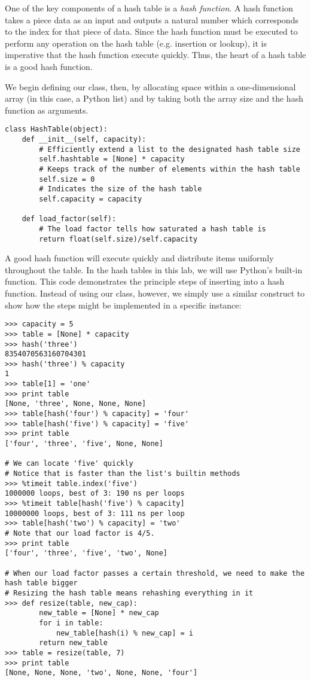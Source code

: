 One of the key components of a hash table is a \emph{hash function}.
A hash function takes a piece data as an input and outputs a natural number which corresponds to the index for that piece of data.
Since the hash function must be executed to perform any operation on the hash table (e.g. insertion or lookup), it is imperative that the hash function execute quickly.
Thus, the heart of a hash table is a good hash function.

We begin defining our  class, then, by allocating space within a one-dimensional array (in this case, a Python list) and by taking both the array size and the hash function as arguments.
\begin{lstlisting}
class HashTable(object):
    def __init__(self, capacity):
        # Efficiently extend a list to the designated hash table size
        self.hashtable = [None] * capacity
        # Keeps track of the number of elements within the hash table
        self.size = 0
        # Indicates the size of the hash table
        self.capacity = capacity

    def load_factor(self):
        # The load factor tells how saturated a hash table is
        return float(self.size)/self.capacity
\end{lstlisting}


A good hash function will execute quickly and distribute items uniformly throughout the table.
In the hash tables in this lab, we will use Python's built-in  function.
This code demonstrates the principle steps of inserting into a hash function.
Instead of using our  class, however, we simply use a similar construct to show how the steps might be implemented in a specific instance:
\begin{lstlisting}
>>> capacity = 5
>>> table = [None] * capacity
>>> hash('three')
8354070563160704301
>>> hash('three') % capacity
1
>>> table[1] = 'one'
>>> print table
[None, 'three', None, None, None]
>>> table[hash('four') % capacity] = 'four'
>>> table[hash('five') % capacity] = 'five'
>>> print table
['four', 'three', 'five', None, None]

# We can locate 'five' quickly
# Notice that is faster than the list's builtin methods
>>> %timeit table.index('five')
1000000 loops, best of 3: 190 ns per loops
>>> %timeit table[hash('five') % capacity]
10000000 loops, best of 3: 111 ns per loop
>>> table[hash('two') % capacity] = 'two'
# Note that our load factor is 4/5.
>>> print table
['four', 'three', 'five', 'two', None]

# When our load factor passes a certain threshold, we need to make the hash table bigger
# Resizing the hash table means rehashing everything in it
>>> def resize(table, new_cap):
        new_table = [None] * new_cap
        for i in table:
            new_table[hash(i) % new_cap] = i
        return new_table
>>> table = resize(table, 7)
>>> print table
[None, None, None, 'two', None, None, 'four']
\end{lstlisting}

